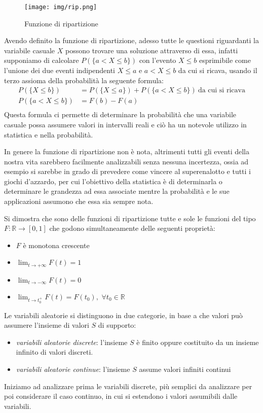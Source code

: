 \documentclass[a4paper,12pt, oneside]{book}
\newcommand{\numberset}{\mathbb}
\newcommand{\R}{\numberset{R}}
\begin{document}
\begin{figure}
    \centering
    \caption{Funzione di ripartizione}
    \label{img:ripartizione}
    \texttt{[image: img/rip.png]}
\end{figure}
Avendo definito la funzione di ripartizione, adesso tutte le questioni riguardanti la variabile casuale $X$
possono trovare una soluzione attraverso di essa, infatti supponiamo di calcolare $P(\{a < X \leq b\})$
con l'evento ${X \leq b}$ esprimibile come l'unione dei due eventi indipendenti ${X \leq a}$ e ${a < X \leq b}$ 
da cui si ricava, usando il terzo assioma della probabilità la seguente formula:
\[ \begin{split}
        P(\{X \leq b\}) & = P(\{X \leq a\}) + P(\{a < X \leq b\}) \ \text{da cui si ricava} \\
        P(\{a < X \leq b\}) & = F(b) - F(a) \\
    \end{split} \]
Questa formula ci permette di determinare la probabilità che una variabile casuale possa assumere valori in intervalli reali
e ciò ha un notevole utilizzo in statistica e nella probabilità.

In genere la funzione di ripartizione non è nota, altrimenti tutti gli eventi della nostra vita sarebbero facilmente analizzabili
senza nessuna incertezza, ossia ad esempio si sarebbe in grado di prevedere come vincere al superenalotto e
tutti i giochi d'azzardo,  per cui l'obiettivo della statistica è di determinarla o determinare le grandezza ad essa associate
mentre la probabilità e le sue applicazioni assumono che essa sia  sempre nota.

Si dimostra che sono delle funzioni di ripartizione tutte e sole le funzioni del tipo $F: \R \to [0, 1]$
che godono simultaneamente delle seguenti proprietà:
\begin{itemize}
    \item $F$ è monotona crescente
    \item $\lim_{t \to +\infty} F(t) = 1$
    \item $\lim_{t \to -\infty} F(t) = 0$
    \item $\lim_{t \to t_0 ^ +} F(t) = F(t_0),\,\,\forall t_0 \in \R$
\end{itemize}
Le variabili aleatorie si distinguono in due categorie, in base a che valori può assumere 
l'insieme di valori $S$ di supporto:
\begin{itemize}
    \item \emph{variabili aleatorie discrete}: l'insieme $S$ è finito oppure costituito da un insieme
                                               infinito di valori discreti.
    \item \emph{variabili aleatorie continue}: l'insieme $S$ assume valori infiniti continui
\end{itemize}
Iniziamo ad analizzare prima le variabili discrete, più semplici da analizzare per poi considerare il caso
continuo, in cui si estendono i valori assumibili dalle variabili.
\end{document}
